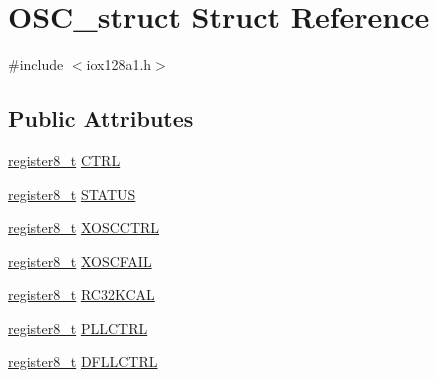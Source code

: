 \hypertarget{struct_o_s_c__struct}{
\section{OSC\_\-struct Struct Reference}
\label{struct_o_s_c__struct}
}


{\ttfamily \#include $<$iox128a1.h$>$}

\subsection*{Public Attributes}
\begin{DoxyCompactItemize}
\item 
\hyperlink{iox128a1_8h_a6a0649252b392263406882923b04a9db}{register8\_\-t} \hyperlink{struct_o_s_c__struct_abb55d14e49bb9b0d6e67d5a629f33469}{CTRL}
\item 
\hyperlink{iox128a1_8h_a6a0649252b392263406882923b04a9db}{register8\_\-t} \hyperlink{struct_o_s_c__struct_a58fa3d26755565f35125d6b8c190b1c4}{STATUS}
\item 
\hyperlink{iox128a1_8h_a6a0649252b392263406882923b04a9db}{register8\_\-t} \hyperlink{struct_o_s_c__struct_a380ee378fe8623ecd473c6656959cdaa}{XOSCCTRL}
\item 
\hyperlink{iox128a1_8h_a6a0649252b392263406882923b04a9db}{register8\_\-t} \hyperlink{struct_o_s_c__struct_aff9bd255b74da429124802d9dc4b0b52}{XOSCFAIL}
\item 
\hyperlink{iox128a1_8h_a6a0649252b392263406882923b04a9db}{register8\_\-t} \hyperlink{struct_o_s_c__struct_a82e04fbafe8bb39238c2f90323bcdae4}{RC32KCAL}
\item 
\hyperlink{iox128a1_8h_a6a0649252b392263406882923b04a9db}{register8\_\-t} \hyperlink{struct_o_s_c__struct_ae66937d447af0de1d98a82b521c2dd80}{PLLCTRL}
\item 
\hyperlink{iox128a1_8h_a6a0649252b392263406882923b04a9db}{register8\_\-t} \hyperlink{struct_o_s_c__struct_aacaa3061d2c95ae3a4492a48c8d337cf}{DFLLCTRL}
\end{DoxyCompactItemize}


